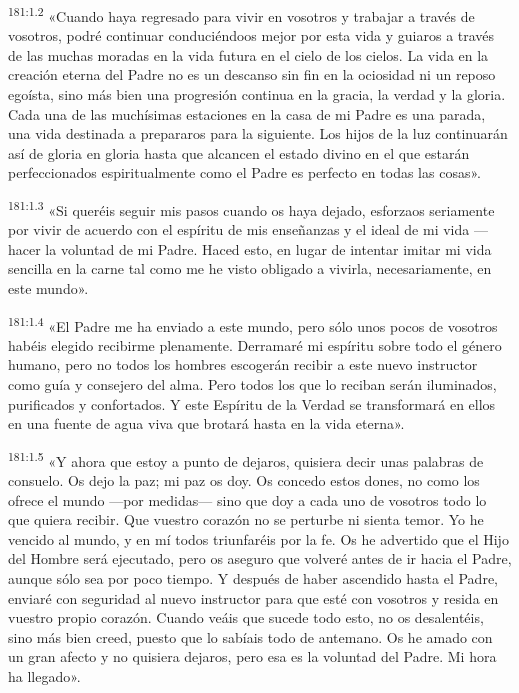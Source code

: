 \par 
\textsuperscript{181:1.2} «Cuando haya regresado para vivir en vosotros y trabajar a través de vosotros, podré continuar conduciéndoos mejor por esta vida y guiaros a través de las muchas moradas en la vida futura en el cielo de los cielos. La vida en la creación eterna del Padre no es un descanso sin fin en la ociosidad ni un reposo egoísta, sino más bien una progresión continua en la gracia, la verdad y la gloria. Cada una de las muchísimas estaciones en la casa de mi Padre es una parada, una vida destinada a prepararos para la siguiente. Los hijos de la luz continuarán así de gloria en gloria hasta que alcancen el estado divino en el que estarán perfeccionados espiritualmente como el Padre es perfecto en todas las cosas».

\par 
\textsuperscript{181:1.3} «Si queréis seguir mis pasos cuando os haya dejado, esforzaos seriamente por vivir de acuerdo con el espíritu de mis enseñanzas y el ideal de mi vida ---hacer la voluntad de mi Padre. Haced esto, en lugar de intentar imitar mi vida sencilla en la carne tal como me he visto obligado a vivirla, necesariamente, en este mundo».

\par 
\textsuperscript{181:1.4} «El Padre me ha enviado a este mundo, pero sólo unos pocos de vosotros habéis elegido recibirme plenamente. Derramaré mi espíritu sobre todo el género humano, pero no todos los hombres escogerán recibir a este nuevo instructor como guía y consejero del alma. Pero todos los que lo reciban serán iluminados, purificados y confortados. Y este Espíritu de la Verdad se transformará en ellos en una fuente de agua viva que brotará hasta en la vida eterna».

\par 
\textsuperscript{181:1.5} «Y ahora que estoy a punto de dejaros, quisiera decir unas palabras de consuelo. Os dejo la paz; mi paz os doy. Os concedo estos dones, no como los ofrece el mundo ---por medidas--- sino que doy a cada uno de vosotros todo lo que quiera recibir. Que vuestro corazón no se perturbe ni sienta temor. Yo he vencido al mundo, y en mí todos triunfaréis por la fe. Os he advertido que el Hijo del Hombre será ejecutado, pero os aseguro que volveré antes de ir hacia el Padre, aunque sólo sea por poco tiempo. Y después de haber ascendido hasta el Padre, enviaré con seguridad al nuevo instructor para que esté con vosotros y resida en vuestro propio corazón. Cuando veáis que sucede todo esto, no os desalentéis, sino más bien creed, puesto que lo sabíais todo de antemano. Os he amado con un gran afecto y no quisiera dejaros, pero esa es la voluntad del Padre. Mi hora ha llegado».

